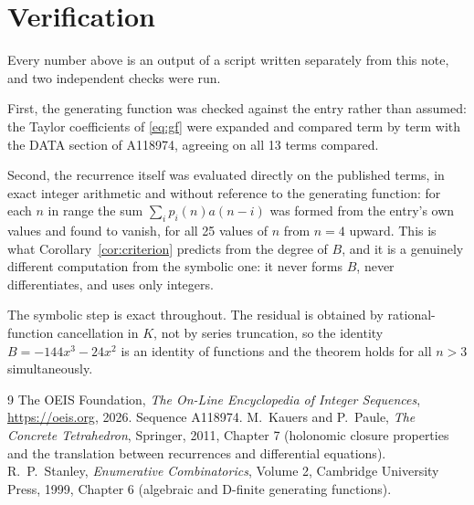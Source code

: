 \documentclass[11pt,a4paper]{article}
\theoremstyle{plain}
\theoremstyle{definition}
\begin{document}
\section{Verification}

Every number above is an output of a script written separately from this note, and two
independent checks were run.

First, the generating function was checked against the entry rather than assumed: the
Taylor coefficients of \eqref{eq:gf} were expanded and compared term by term with the DATA
section of A118974, agreeing on all 13 terms compared.

Second, the recurrence itself was evaluated directly on the published terms, in exact
integer arithmetic and without reference to the generating function: for each $n$ in range
the sum $\sum_{i}p_{i}(n)a(n-i)$ was formed from the entry's own values and found to
vanish, for all 25 values of $n$ from $n=4$ upward. This is what
Corollary~\ref{cor:criterion} predicts from the degree of $B$, and it is a genuinely
different computation from the symbolic one: it never forms $B$, never differentiates, and
uses only integers.

The symbolic step is exact throughout. The residual is obtained by rational-function
cancellation in $K$, not by series truncation, so the identity $B=- 144 x^{3} - 24 x^{2}$ is an
identity of functions and the theorem holds for all $n>3$ simultaneously.

\begin{thebibliography}{9}
 The OEIS Foundation, \emph{The On-Line Encyclopedia of Integer Sequences},
\url{https://oeis.org}, 2026. Sequence A118974.
 M.~Kauers and P.~Paule, \emph{The Concrete Tetrahedron}, Springer, 2011,
Chapter 7 (holonomic closure properties and the translation between recurrences and
differential equations).
 R.~P.~Stanley, \emph{Enumerative Combinatorics}, Volume 2, Cambridge
University Press, 1999, Chapter 6 (algebraic and D-finite generating functions).
\end{thebibliography}
\end{document}
